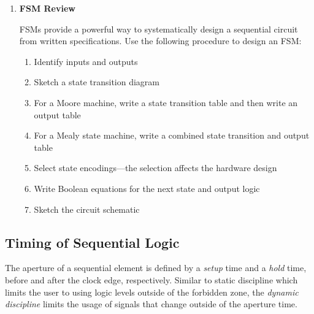 \documentclass[12pt]{article}
\begin{document}
\begin{enumerate}
  \item \textbf{FSM Review}

  FSMs provide a powerful way to systematically design a sequential circuit from written specifications. Use the following procedure to design an FSM:

  \begin{enumerate}
    \item Identify inputs and outputs
    \item Sketch a state transition diagram
    \item For a Moore machine, write a state transition table and then write an output table
    \item For a Mealy state machine, write a combined state transition and output table
    \item Select state encodings---the selection affects the hardware design
    \item Write Boolean equations for the next state and output logic
    \item Sketch the circuit schematic
  \end{enumerate}
\end{enumerate}

\subsection{Timing of Sequential Logic}

The aperture of a sequential element is defined by a \textit{setup} time and a \textit{hold} time, before and after the clock edge, respectively. Similar to static discipline which limits the user to using logic levels outside of the forbidden zone, the \textit{dynamic discipline} limits the usage of signals that change outside of the aperture time.
\end{document}
